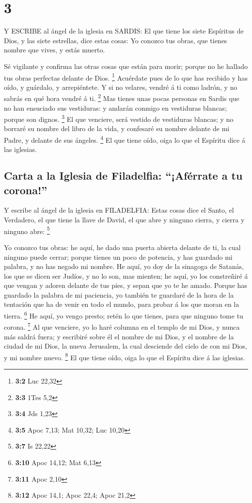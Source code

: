 \hypertarget{section-2}{%
\section{3}\label{section-2}}

 Y ESCRIBE al ángel de la iglesia en SARDIS: El que tiene
los siete Espíritus de Dios, y las siete estrellas, dice estas cosas: Yo
conozco tus obras, que tienes nombre que vives, y estás muerto.

 Sé vigilante y confirma las otras cosas que están para
morir; porque no he hallado tus obras perfectas delante de Dios.
\footnote{\textbf{3:2} Luc 22,32}  Acuérdate pues de lo que
has recibido y has oído, y guárdalo, y arrepiéntete. Y si no velares,
vendré á ti como ladrón, y no sabrás en qué hora vendré á ti.
\footnote{\textbf{3:3} 1Tes 5,2}  Mas tienes unas pocas
personas en Sardis que no han ensuciado sus vestiduras: y andarán
conmigo en vestiduras blancas; porque son dignos. \footnote{\textbf{3:4}
  Jds 1,23}  El que venciere, será vestido de vestiduras
blancas; y no borraré su nombre del libro de la vida, y confesaré su
nombre delante de mi Padre, y delante de sus ángeles. \footnote{\textbf{3:5}
  Apoc 7,13; Mat 10,32; Luc 10,20}  El que tiene oído, oiga
lo que el Espíritu dice á las iglesias.

\hypertarget{carta-a-la-iglesia-de-filadelfia-afuxe9rrate-a-tu-corona}{%
\subsection{Carta a la Iglesia de Filadelfia: ``¡Aférrate a tu
corona!''}\label{carta-a-la-iglesia-de-filadelfia-afuxe9rrate-a-tu-corona}}

 Y escribe al ángel de la iglesia en FILADELFIA: Estas cosas
dice el Santo, el Verdadero, el que tiene la llave de David, el que abre
y ninguno cierra, y cierra y ninguno abre: \footnote{\textbf{3:7} Is
  22,22}

 Yo conozco tus obras: he aquí, he dado una puerta abierta
delante de ti, la cual ninguno puede cerrar; porque tienes un poco de
potencia, y has guardado mi palabra, y no has negado mi nombre.
 He aquí, yo doy de la sinagoga de Satanás, los que se dicen
ser Judíos, y no lo son, mas mienten; he aquí, yo los constreñiré á que
vengan y adoren delante de tus pies, y sepan que yo te he amado.
 Porque has guardado la palabra de mi paciencia, yo también
te guardaré de la hora de la tentación que ha de venir en todo el mundo,
para probar á los que moran en la tierra. \footnote{\textbf{3:10} Apoc
  14,12; Mat 6,13}  He aquí, yo vengo presto; retén lo que
tienes, para que ninguno tome tu corona. \footnote{\textbf{3:11} Apoc
  2,10}  Al que venciere, yo lo haré columna en el templo
de mi Dios, y nunca más saldrá fuera; y escribiré sobre él el nombre de
mi Dios, y el nombre de la ciudad de mi Dios, la nueva Jerusalem, la
cual desciende del cielo de con mi Dios, y mi nombre nuevo. \footnote{\textbf{3:12}
  Apoc 14,1; Apoc 22,4; Apoc 21,2}  El que tiene oído, oiga
lo que el Espíritu dice á las iglesias.


